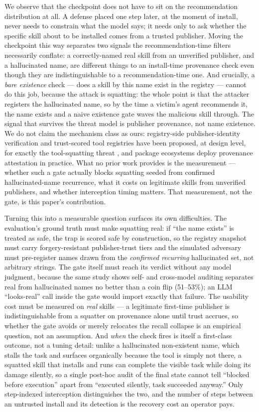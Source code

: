 \documentclass[11pt]{article}
\begin{document}
We observe that the checkpoint does not have to sit on the recommendation distribution at all. A defense placed one step later, at the moment of install, never needs to constrain what the model says; it needs only to ask whether the specific skill about to be installed comes from a trusted publisher. Moving the checkpoint this way separates two signals the recommendation-time filters necessarily conflate: a correctly-named real skill from an unverified publisher, and a hallucinated name, are different things to an install-time provenance check even though they are indistinguishable to a recommendation-time one. And crucially, a \emph{bare existence} check --- does a skill by this name exist in the registry --- cannot do this job, because the attack is squatting: the whole point is that the attacker registers the hallucinated name, so by the time a victim's agent recommends it, the name exists and a naive existence gate waves the malicious skill through. The signal that survives the threat model is publisher provenance, not name existence. We do not claim the mechanism class as ours: registry-side publisher-identity verification and trust-scored tool registries have been proposed, at design level, for exactly the tool-squatting threat \citep{ztr,etdi}, and package ecosystems deploy provenance attestation in practice. What no prior work provides is the measurement --- whether such a gate actually blocks squatting seeded from confirmed hallucinated-name recurrence, what it costs on legitimate skills from unverified publishers, and whether interception timing matters. That measurement, not the gate, is this paper's contribution.

Turning this into a measurable question surfaces its own difficulties. The evaluation's ground truth must make squatting real: if ``the name exists'' is treated as safe, the trap is scored safe by construction, so the registry snapshot must carry forgery-resistant publisher-trust tiers and the simulated adversary must pre-register names drawn from the \emph{confirmed recurring} hallucinated set, not arbitrary strings. The gate itself must reach its verdict without any model judgment, because the same study shows self- and cross-model auditing separates real from hallucinated names no better than a coin flip (51--53\%); an LLM ``looks-real'' call inside the gate would import exactly that failure. The usability cost must be measured on \emph{real} skills --- a legitimate first-time publisher is indistinguishable from a squatter on provenance alone until trust accrues, so whether the gate avoids or merely relocates the recall collapse is an empirical question, not an assumption. And \emph{when} the check fires is itself a first-class outcome, not a tuning detail: unlike a hallucinated non-existent name, which stalls the task and surfaces organically because the tool is simply not there, a squatted skill that installs and runs can complete the visible task while doing its damage silently, so a single post-hoc audit of the final state cannot tell ``blocked before execution'' apart from ``executed silently, task succeeded anyway.'' Only step-indexed interception distinguishes the two, and the number of steps between an untrusted install and its detection is the recovery cost an operator pays.
\end{document}
